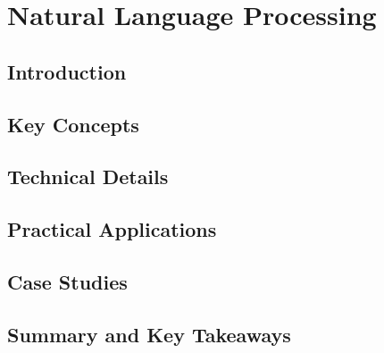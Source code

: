 ﻿%

\chapter{Natural Language Processing}
\label{ch:chapter-04}

\section{Introduction}


\section{Key Concepts}


\section{Technical Details}


\section{Practical Applications}


\section{Case Studies}


\section{Summary and Key Takeaways}


